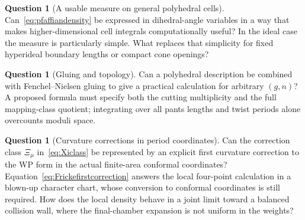 \documentclass[11pt,a4paper]{article}
\numberwithin{equation}{section}
\theoremstyle{definition}
\newtheorem{question}[theorem]{Question}
\theoremstyle{remark}
\begin{document}
\begin{question}[A usable measure on general polyhedral cells]
Can~\eqref{eq:pfaffiandensity} be expressed in dihedral-angle variables in
a way that makes higher-dimensional cell integrals computationally useful?
In the ideal case the measure is particularly simple. What replaces that
simplicity for fixed hyperideal boundary lengths or compact cone openings?
\end{question}

\begin{question}[Gluing and topology]
Can a polyhedral description be combined with Fenchel--Nielsen gluing to
give a practical calculation for arbitrary $(g,n)$? A proposed formula
must specify both the cutting multiplicity and the full mapping-class
quotient; integrating over all pants lengths and twist periods alone
overcounts moduli space.
\end{question}

\begin{question}[Curvature corrections in period coordinates]
Can the correction class $\Xi_\mu$ in~\eqref{eq:Xiclass} be represented
by an explicit first curvature correction to the WP form in
the actual finite-area conformal coordinates? Equation~\eqref{eq:Frickefirstcorrection}
answers the local four-point calculation in a blown-up character chart,
whose conversion to conformal coordinates is still required.
How does the local density behave
in a joint limit toward a balanced collision wall, where the
final-chamber expansion is not uniform in the weights?
\end{question}
\end{document}
